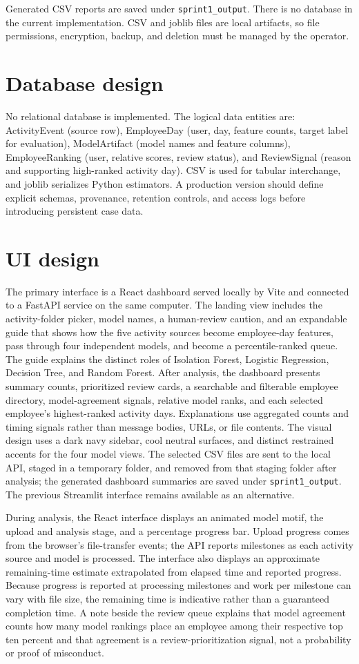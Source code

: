 \documentclass[12pt,a4paper,oneside]{report}
\begin{document}
Generated CSV reports are saved under \texttt{sprint1\_output}. There is
no database in the current implementation. CSV and joblib files are
local artifacts, so file permissions, encryption, backup, and deletion
must be managed by the operator.

\section{Database design}
No relational database is implemented. The logical data entities are:
ActivityEvent (source row), EmployeeDay (user, day,
feature counts, target label for evaluation), ModelArtifact
(model names and feature columns), EmployeeRanking (user,
relative scores, review status), and ReviewSignal (reason and
supporting high-ranked activity day). CSV is used for tabular
interchange, and joblib serializes Python estimators. A production
version should define explicit schemas, provenance, retention controls,
and access logs before introducing persistent case data.

\section{UI design}
The primary interface is a React dashboard served locally by Vite and
connected to a FastAPI service on the same computer. The landing view
includes the activity-folder picker, model names, a human-review
caution, and an expandable guide that shows how the five activity
sources become employee-day features, pass through four independent
models, and become a percentile-ranked queue. The guide explains the
distinct roles of Isolation Forest, Logistic Regression, Decision Tree,
and Random Forest. After analysis, the dashboard presents summary
counts, prioritized review cards, a searchable and filterable employee
directory, model-agreement signals, relative model ranks, and each
selected employee's highest-ranked activity days. Explanations use
aggregated counts and timing signals rather than message bodies, URLs,
or file contents. The visual design uses a dark navy sidebar, cool
neutral surfaces, and distinct restrained accents for the four model
views. The selected CSV files are sent to the local API,
staged in a temporary folder, and removed from that staging folder after
analysis; the generated dashboard summaries are saved under
\texttt{sprint1\_output}. The previous Streamlit interface remains
available as an alternative.

During analysis, the React interface displays an animated model motif,
the upload and analysis stage, and a percentage progress bar. Upload
progress comes from the browser's file-transfer events; the API reports
milestones as each activity source and model is processed. The interface
also displays an approximate remaining-time estimate extrapolated from
elapsed time and reported progress. Because progress is reported at
processing milestones and work per milestone can vary with file size,
the remaining time is indicative rather than a guaranteed completion
time. A note beside the review queue explains that model agreement counts
how many model rankings place an employee among their respective top ten
percent and that agreement is a review-prioritization signal, not a
probability or proof of misconduct.
\end{document}
